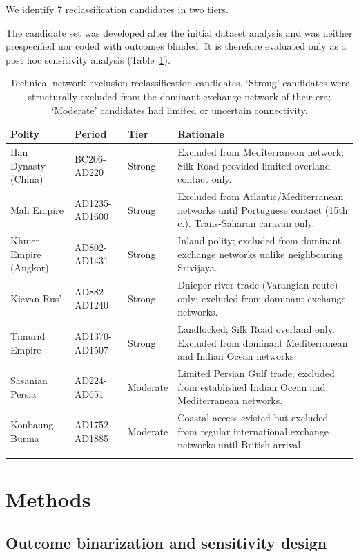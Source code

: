 \documentclass[pdflatex,sn-basic]{sn-jnl}
\theoremstyle{thmstyleone}%
\theoremstyle{thmstyletwo}%
\theoremstyle{thmstylethree}%
\begin{document}
We identify 7 reclassification candidates in two tiers.

The candidate set was developed after the initial dataset analysis and was neither prespecified nor coded with outcomes blinded. It is therefore evaluated only as a post hoc sensitivity analysis (Table~\ref{tab:reclass}).

\begin{table}[htbp]
\caption{Technical network exclusion reclassification candidates. `Strong' candidates were structurally excluded from the dominant exchange network of their era; `Moderate' candidates had limited or uncertain connectivity.}
\label{tab:reclass}
\begin{tabular*}{\textwidth}{@{\extracolsep\fill}lllp{7cm}}
\toprule
Polity & Period & Tier & Rationale \\
\midrule
Han Dynasty (China) & BC206-AD220 & Strong & Excluded from Mediterranean network; Silk Road provided limited overland contact only. \\
Mali Empire & AD1235-AD1600 & Strong & Excluded from Atlantic/Mediterranean networks until Portuguese contact (15th c.). Trans-Saharan caravan only. \\
Khmer Empire (Angkor) & AD802-AD1431 & Strong & Inland polity; excluded from dominant exchange networks unlike neighbouring Srivijaya. \\
Kievan Rus' & AD882-AD1240 & Strong & Dnieper river trade (Varangian route) only; excluded from dominant exchange networks. \\
Timurid Empire & AD1370-AD1507 & Strong & Landlocked; Silk Road overland only. Excluded from dominant Mediterranean and Indian Ocean networks. \\
Sasanian Persia & AD224-AD651 & Moderate & Limited Persian Gulf trade; excluded from established Indian Ocean and Mediterranean networks. \\
Konbaung Burma & AD1752-AD1885 & Moderate & Coastal access existed but excluded from regular international exchange networks until British arrival. \\
\botrule
\end{tabular*}
\end{table}

\section{Methods}\label{sec:methods}

\subsection{Outcome binarization and sensitivity design}\label{sec:methods-binarization}
\end{document}
